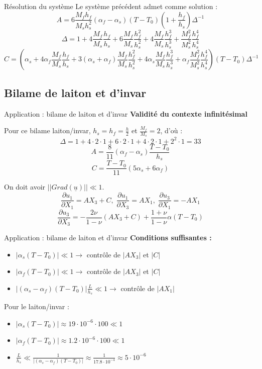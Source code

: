 \begin{frame}{Résolution du système}
    Le système précédent admet comme solution :
    $$A = 6\frac{M_fh_f}{M_sh_{s}^{2}}(\alpha_f-\alpha_s)(T-T_0)(1+\frac{h_f}{h_s})\Delta^{-1}$$
    $$\Delta = 1+4\frac{M_f}{M_s}\frac{h_f}{h_s}+6\frac{M_f}{M_s}\frac{h_f^2}{h_s^2}+4\frac{M_f}{M_s}\frac{h_f^3}{h_s^3}+\frac{M_f^2}{M_s^2}\frac{h_f^4}{h_s^4}$$
    $$C = (\alpha_s+4\alpha_f\frac{M_f}{M_s}\frac{h_f}{h_s}+3(\alpha_s+\alpha_f)\frac{M_f}{M_s}\frac{h_f^2}{h_s^2}+4\alpha_s\frac{M_f}{M_s}\frac{h_f^3}{h_s^3}+\alpha_f\frac{M_f^2}{M_s^2}\frac{h_f^4}{h_s^4})(T-T_0)\Delta^{-1}$$
\end{frame}

\subsection{Bilame de laiton et d'invar}

\begin{frame}{Application : bilame de laiton et d'invar}
    \textbf{\Large{Validité du contexte infinitésimal}}
    
    Pour ce bilame laiton/invar, $h_s = h_f = \frac{h}{2}$ et $\frac{M_f}{M_s} = 2$, d'où :
    $$\Delta = 1+4\cdot2\cdot1+6\cdot2\cdot1+4\cdot2\cdot1+2^{2}\cdot1 = 33$$
    $$A = \frac{8}{11}(\alpha_f-\alpha_s)\frac{T-T_0}{h_s}$$
    $$C = \frac{T-T_0}{11}(5\alpha_s+6\alpha_f)$$
    
    On doit avoir $||Grad(\underline{u})|| \ll 1$.
    $$\frac{\partial u_1}{\partial X_1} = A X_3+C,\; \frac{\partial u_1}{\partial X_3} = A X_1,\; \frac{\partial u_3}{\partial X_1} = -A X_1$$
    $$\frac{\partial u_3}{\partial X_3} = -\frac{2\nu}{1-\nu}(A X_3 + C) + \frac{1+\nu}{1-\nu}\alpha(T-T_0)$$
\end{frame}

\begin{frame}{Application : bilame de laiton et d'invar}
    \textbf{Conditions suffisantes :}
    \begin{itemize}
        \item $|\alpha_s(T-T_0)|\ll 1 \rightarrow$ contrôle de $|A X_3|$ et $|C|$
        \item $|\alpha_f(T-T_0)|\ll 1 \rightarrow$ contrôle de $|A X_3|$ et $|C|$
        \item $|(\alpha_s-\alpha_f)(T-T_0)|\frac{L}{h_s}\ll 1 \rightarrow$ contrôle de $|A X_1|$
    \end{itemize}
    Pour le laiton/invar :
    \begin{itemize}
        \item $|\alpha_s(T-T_0)|\approx19\cdot10^{-6}\cdot100\ll1$
        \item $|\alpha_f(T-T_0)|\approx1.2\cdot10^{-6}\cdot100\ll1$
        \item $\frac{L}{h_s}\ll \frac{1}{|(\alpha_s-\alpha_f)(T-T_0)|} \approx \frac{1}{17.8\cdot 10^{-4}}\approx 5\cdot 10^{-6}$
    \end{itemize}
\end{frame}

